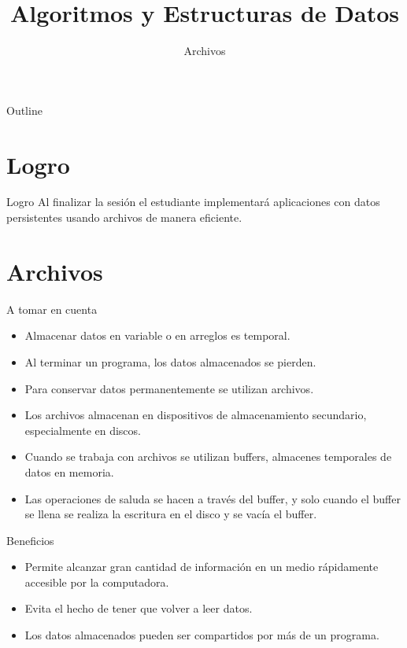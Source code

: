 \documentclass[aspectratio=169]{beamer}
\title{Algoritmos y Estructuras de Datos}
\subtitle{Archivos}
\date{\the\year}
\institute{\href{http://www.upc.edu.pe}{Universidad Peruana de Ciencias Aplicadas}}
\begin{document}
\maketitle

\begin{frame}{Outline}
\tableofcontents
\end{frame}

\section{Logro}
\begin{frame}{Logro}
Al finalizar la sesión el estudiante implementará aplicaciones con datos
persistentes usando archivos de manera eficiente.
\end{frame}

\section{Archivos}
\begin{frame}{A tomar en cuenta}
\begin{itemize}
\item Almacenar datos en variable o en arreglos es temporal.
\item Al terminar un programa, los datos almacenados se pierden.
\item Para conservar datos permanentemente se utilizan archivos.
\item Los archivos almacenan en dispositivos de almacenamiento secundario,
especialmente en discos.
\item Cuando se trabaja con archivos se utilizan buffers, almacenes temporales
de datos en memoria.
\item Las operaciones de saluda se hacen a través del buffer, y solo cuando el
buffer se llena se realiza la escritura en el disco y se vacía el buffer.
\end{itemize}
\end{frame}

\begin{frame}{Beneficios}
\begin{itemize}
\item Permite alcanzar gran cantidad de información en un medio rápidamente
accesible por la computadora.
\item Evita el hecho de tener que volver a leer datos.
\item Los datos almacenados pueden ser compartidos por más de un programa.
\end{itemize}
\end{frame}
\end{document}
